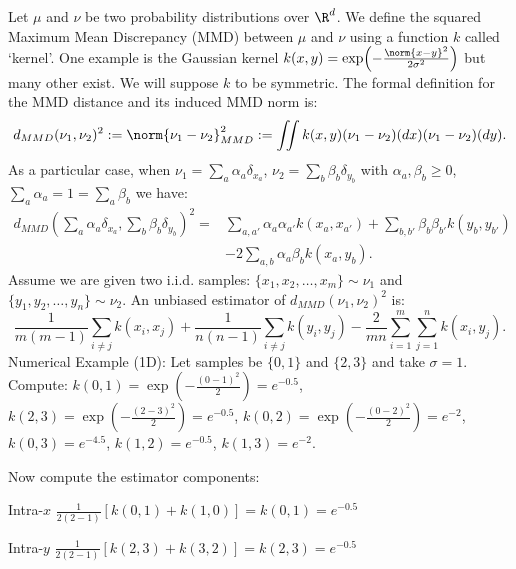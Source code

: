 \begin{example}\label{ex:ch7-MMD}
Let $\mu$ and $\nu$ be two probability distributions over $\R^d$. We define the squared Maximum Mean Discrepancy (MMD) between $\mu$ and $\nu$ using a function $k$ called `kernel'. One example is the Gaussian kernel $k(x, y) = \exp\!\left( -\frac{\norm{x-y}^2}{2 \sigma^2} \right)$ but many other exist. We will suppose $k$ to be symmetric. The formal definition for the MMD distance and its induced MMD norm is:
\begin{equation}\label{eq:ch7-MMD-def}
  d_{MMD}(\nu_1, \nu_2)^2 := \norm{\nu_1 - \nu_2}^2_{MMD} := \iint k(x, y) (\nu_1 - \nu_2)(dx)(\nu_1 - \nu_2)(dy).
\end{equation}
As a particular case, when $\nu_1 = \sum_a \alpha_a \delta_{x_a}$, $\nu_2 = \sum_b \beta_b \delta_{y_b}$ with $\alpha_a, \beta_b \geq 0$, $\sum_a \alpha_a = 1 = \sum_a \beta_b$ we have:
\begin{equation}\label{eq:ch7-MMD-discrete}
  \begin{aligned}
    d_{MMD}\!\left( \sum_a \alpha_a \delta_{x_a}, \sum_b \beta_b \delta_{y_b} \right)^2 = &\sum_{a, a'} \alpha_a \alpha_{a'} k(x_a, x_{a'}) + \sum_{b, b'} \beta_b \beta_{b'} k(y_b, y_{b'}) \\
    &- 2 \sum_{a, b} \alpha_a \beta_b k(x_a, y_b).
  \end{aligned}
\end{equation}
Assume we are given two i.i.d. samples: $\{x_1, x_2, \ldots, x_m\} \sim \nu_1$ and $\{y_1, y_2, \ldots, y_n\} \sim \nu_2$. An unbiased estimator of $d_{MMD}(\nu_1, \nu_2)^2$ is:
\begin{equation}\label{eq:ch7-MMD-estimator}
  \frac{1}{m(m-1)} \sum_{i \neq j} k(x_i, x_j) + \frac{1}{n(n-1)} \sum_{i \neq j} k(y_i, y_j) - \frac{2}{mn} \sum_{i=1}^{m} \sum_{j=1}^{n} k(x_i, y_j).
\end{equation}
Numerical Example (1D): Let samples be $\{0, 1\}$ and $\{2, 3\}$ and take $\sigma = 1$. Compute: $k(0, 1) = \exp\!\left( -\frac{(0-1)^2}{2} \right) = e^{-0.5}$, $k(2, 3) = \exp\!\left( -\frac{(2-3)^2}{2} \right) = e^{-0.5}$, $k(0, 2) = \exp\!\left( -\frac{(0-2)^2}{2} \right) = e^{-2}$, $k(0, 3) = e^{-4.5}$, $k(1, 2) = e^{-0.5}$, $k(1, 3) = e^{-2}$.

Now compute the estimator components:

Intra-$x$ $\frac{1}{2(2-1)}[k(0,1) + k(1,0)] = k(0,1) = e^{-0.5}$

Intra-$y$ $\frac{1}{2(2-1)}[k(2,3) + k(3,2)] = k(2,3) = e^{-0.5}$


\end{example}
